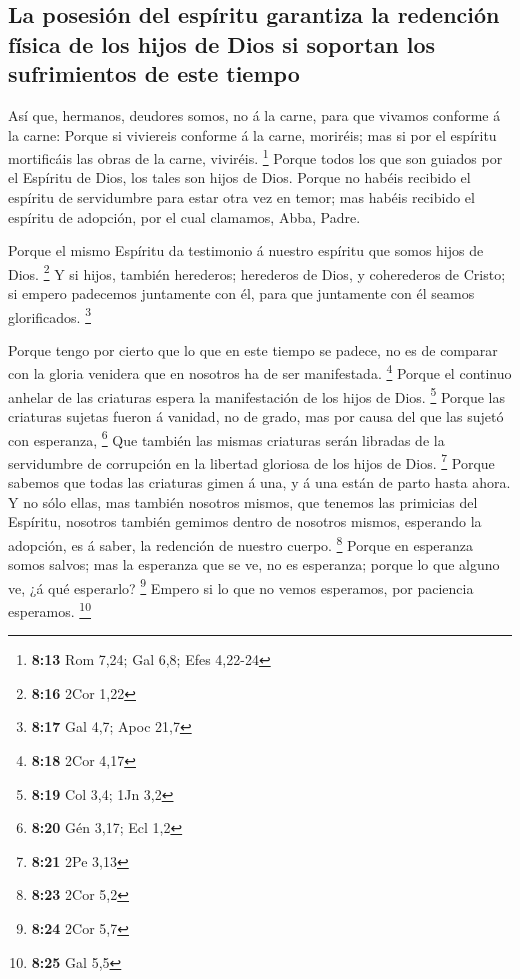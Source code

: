 \hypertarget{la-posesiuxf3n-del-espuxedritu-garantiza-la-redenciuxf3n-fuxedsica-de-los-hijos-de-dios-si-soportan-los-sufrimientos-de-este-tiempo}{%
\subsection{La posesión del espíritu garantiza la redención física de
los hijos de Dios si soportan los sufrimientos de este
tiempo}\label{la-posesiuxf3n-del-espuxedritu-garantiza-la-redenciuxf3n-fuxedsica-de-los-hijos-de-dios-si-soportan-los-sufrimientos-de-este-tiempo}}

 Así que, hermanos, deudores somos, no á la carne, para que
vivamos conforme á la carne:  Porque si viviereis conforme
á la carne, moriréis; mas si por el espíritu mortificáis las obras de la
carne, viviréis. \footnote{\textbf{8:13} Rom 7,24; Gal 6,8; Efes 4,22-24}
 Porque todos los que son guiados por el Espíritu de Dios,
los tales son hijos de Dios.  Porque no habéis recibido el
espíritu de servidumbre para estar otra vez en temor; mas habéis
recibido el espíritu de adopción, por el cual clamamos, Abba, Padre.

 Porque el mismo Espíritu da testimonio á nuestro espíritu
que somos hijos de Dios. \footnote{\textbf{8:16} 2Cor 1,22}
 Y si hijos, también herederos; herederos de Dios, y
coherederos de Cristo; si empero padecemos juntamente con él, para que
juntamente con él seamos glorificados. \footnote{\textbf{8:17} Gal 4,7;
  Apoc 21,7}

 Porque tengo por cierto que lo que en este tiempo se
padece, no es de comparar con la gloria venidera que en nosotros ha de
ser manifestada. \footnote{\textbf{8:18} 2Cor 4,17}  Porque
el continuo anhelar de las criaturas espera la manifestación de los
hijos de Dios. \footnote{\textbf{8:19} Col 3,4; 1Jn 3,2} 
Porque las criaturas sujetas fueron á vanidad, no de grado, mas por
causa del que las sujetó con esperanza, \footnote{\textbf{8:20} Gén
  3,17; Ecl 1,2}  Que también las mismas criaturas serán
libradas de la servidumbre de corrupción en la libertad gloriosa de los
hijos de Dios. \footnote{\textbf{8:21} 2Pe 3,13}  Porque
sabemos que todas las criaturas gimen á una, y á una están de parto
hasta ahora.  Y no sólo ellas, mas también nosotros mismos,
que tenemos las primicias del Espíritu, nosotros también gemimos dentro
de nosotros mismos, esperando la adopción, es á saber, la redención de
nuestro cuerpo. \footnote{\textbf{8:23} 2Cor 5,2}  Porque
en esperanza somos salvos; mas la esperanza que se ve, no es esperanza;
porque lo que alguno ve, ¿á qué esperarlo? \footnote{\textbf{8:24} 2Cor
  5,7}  Empero si lo que no vemos esperamos, por paciencia
esperamos. \footnote{\textbf{8:25} Gal 5,5}

